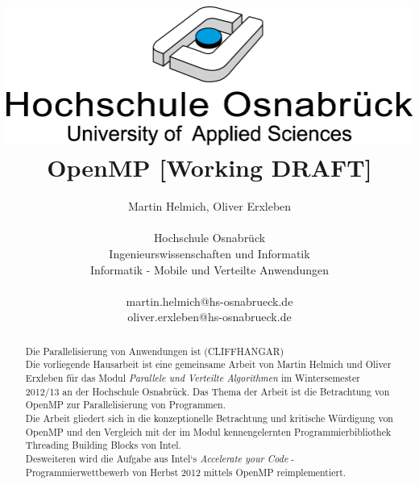 \documentclass{lni}
\begin{document}
\author{
	Martin Helmich, Oliver Erxleben \\ 
	\\ 
	Hochschule Osnabrück \\ 
	Ingenieurswissenschaften und Informatik \\ 
	Informatik - Mobile und Verteilte Anwendungen \\ 
	\\ 
	martin.helmich@hs-osnabrueck.de \\
	oliver.erxleben@hs-osnabrueck.de
}

\title{\includegraphics[scale=0.75,keepaspectratio]{img/hs_os.png}\linebreak \linebreak OpenMP [Working DRAFT]}

\maketitle

\tableofcontents

\begin{abstract}
Die Parallelisierung von Anwendungen ist (CLIFFHANGAR)\\
Die vorliegende Hausarbeit ist eine gemeinsame Arbeit von Martin Helmich und Oliver Erxleben für das Modul \textit{Parallele und Verteilte Algorithmen} im Wintersemester 2012/13 an der Hochschule Osnabrück. Das Thema der Arbeit ist die Betrachtung von OpenMP zur Parallelisierung von Programmen. \\ 
Die Arbeit gliedert sich in die konzeptionelle Betrachtung und kritische Würdigung von OpenMP und den Vergleich mit der im Modul kennengelernten Programmierbibliothek Threading Building Blocks von Intel. \\
Desweiteren wird die Aufgabe aus Intel`s \textit{Accelerate your Code} - Programmierwettbewerb von Herbst 2012 mittels OpenMP reimplementiert.
\end{abstract}

\pagebreak %
\end{document}
